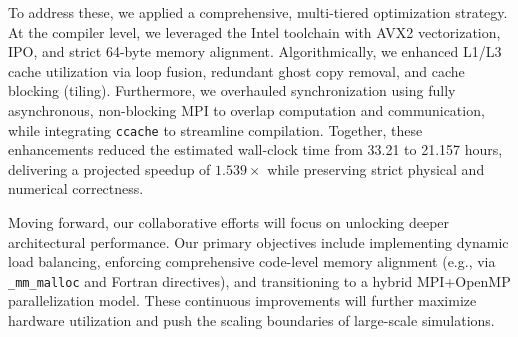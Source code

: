 To address these, we applied a comprehensive, multi-tiered optimization strategy. 
At the compiler level, we leveraged the Intel toolchain with AVX2 vectorization, IPO, and strict 64-byte memory alignment. 
Algorithmically, we enhanced L1/L3 cache utilization via loop fusion, redundant ghost copy removal, and cache blocking (tiling). 
Furthermore, we overhauled synchronization using fully asynchronous, non-blocking MPI to overlap computation and communication, while integrating \texttt{ccache} to streamline compilation. 
Together, these enhancements reduced the estimated wall-clock time from 33.21 to 21.157 hours, delivering a projected speedup of $\mathbf{1.539\times}$ while preserving strict physical and numerical correctness.

Moving forward, our collaborative efforts will focus on unlocking deeper architectural performance. 
Our primary objectives include implementing dynamic load balancing, enforcing comprehensive code-level memory alignment (e.g., via \texttt{\_mm\_malloc} and Fortran directives), and transitioning to a hybrid MPI+OpenMP parallelization model. 
These continuous improvements will further maximize hardware utilization and push the scaling boundaries of large-scale simulations.

